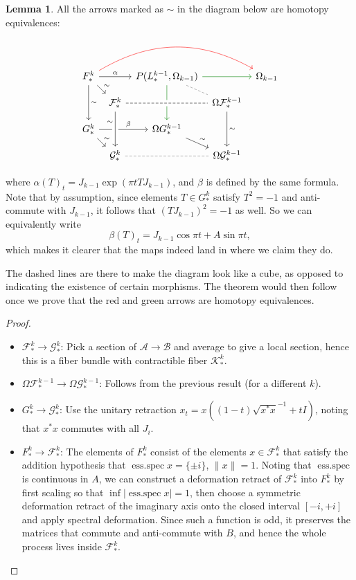 \documentclass{shortart}
\theoremstyle{definition}
\newtheorem*{lemma}{Lemma}
\DeclareMathOperator{\essspec}{ess.spec}
\begin{document}
\begin{lemma}
  All the arrows marked as $\sim$ in the diagram below are homotopy equivalences:
  \begin{useimager}
    \[
      \begin{tikzcd}[row sep=small, column sep=tiny]
        F^k_* \ar[rrrr, bend left, red] \ar[rr, "\alpha"] \ar[dd, "\sim"] \ar[rd, "\sim"] && P(L^{k - 1}_*, \Omega_{k - 1}) \ar[rd, dash, dashed, gray] \ar[dd, green!50!black] \ar[rr, green!50!black] & & \Omega_{k - 1}\\
        & \mathcal{F}^k_* \ar[rr, crossing over, dash, dashed] && \Omega \mathcal{F}^{k - 1}_* \ar[dd, "\sim"]\\
        G^k_* \ar[rr, "\beta", pos=0.6] \ar[rd, "\sim"] & & \Omega G^{k - 1}_* \ar[rd, "\sim"]\\
        & \mathcal{G}^k_* \ar[from=uu, crossing over, "\sim"', pos=0.3] \ar[rr, dash, gray, dashed] & & \Omega \mathcal{G}^{k - 1}_*
      \end{tikzcd}
    \]
  \end{useimager}
  where $\alpha(T)_t = J_{k - 1} \exp (\pi t TJ_{k - 1})$, and $\beta$ is defined by the same formula. Note that by assumption, since elements $T \in G_*^k$ satisfy $T^2 = -1$ and anti-commute with $J_{k - 1}$, it follows that $(TJ_{k - 1})^2 = -1$ as well. So we can equivalently write
  \[
    \beta(T)_t = J_{k - 1}\cos \pi t + A \sin \pi t,
  \]
  which makes it clearer that the maps indeed land in where we claim they do.
\end{lemma}
The dashed lines are there to make the diagram look like a cube, as opposed to indicating the existence of certain morphisms. The theorem would then follow once we prove that the red and green arrows are homotopy equivalences.
\begin{proof}\leavevmode
  \begin{itemize}
    \item $\mathcal{F}^k_* \to \mathcal{G}_*^k$: Pick a section of $\mathcal{A} \to \mathcal{B}$ and average to give a local section, hence this is a fiber bundle with contractible fiber $\mathcal{K}^k_*$.
    \item $\Omega \mathcal{F}_*^{k - 1} \to \Omega \mathcal{G}_*^{k - 1}$: Follows from the previous result (for a different $k$).
    \item $G_*^k \to \mathcal{G}^k_*$: Use the unitary retraction $x_t = x ((1 - t)\sqrt{x^* x}^{-1} + tI)$, noting that $x^* x$ commutes with all $J_i$.
    \item $F_*^k \to \mathcal{F}_*^k$: The elements of $F_*^k$ consist of the elements $x \in \mathcal{F}_*^k$ that satisfy the addition hypothesis that $\essspec x = \{\pm i\}$, $\|x\| = 1$. Noting that $\essspec$ is continuous in $A$, we can construct a deformation retract of $\mathcal{F}_*^k$ into $F_*^k$ by first scaling so that $\inf |\essspec x| = 1$, then choose a symmetric deformation retract of the imaginary axis onto the closed interval $[-i, +i]$ and apply spectral deformation. Since such a function is odd, it preserves the matrices that commute and anti-commute with $B$, and hence the whole process lives inside $\mathcal{F}_*^k$.\qedhere
  \end{itemize}
\end{proof}
\end{document}
